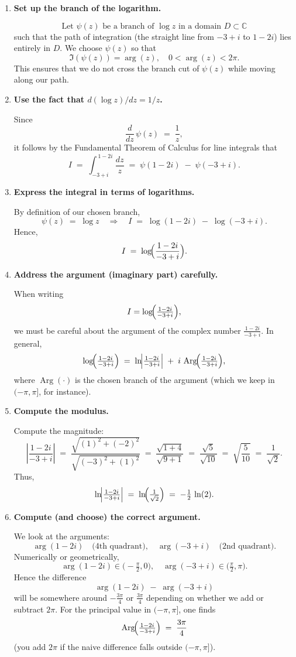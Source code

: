 \documentclass[12pt]{article}
\DeclareMathOperator{\Arg}{Arg}
\theoremstyle{definition} %
\theoremstyle{plain} %
\begin{document}
\begin{enumerate}
\item \textbf{Set up the branch of the logarithm.}

\[
\text{Let }\psi(z)\text{ be a branch of }\log z\text{ in a domain }D \subset \mathbb{C}
\]
such that the path of integration (the straight line from $-3+i$ to $1-2i$) lies entirely in $D$. We choose $\psi(z)$ so that
\[
\Im(\psi(z)) = \arg(z), 
\quad
0 < \arg(z) < 2\pi.
\]
This ensures that we do not cross the branch cut of $\psi(z)$ while moving along our path.

\item \textbf{Use the fact that $d(\log z)/dz = 1/z$.}

Since
\[
\frac{d}{dz}\,\psi(z) \;=\; \frac{1}{z},
\]
it follows by the Fundamental Theorem of Calculus for line integrals that
\[
I \;=\; \int_{-3+i}^{\,1-2i} \frac{dz}{z}
\;=\;
\psi(1-2i) \;-\;\psi(-3+i).
\]

\item \textbf{Express the integral in terms of logarithms.}

By definition of our chosen branch,
\[
\psi(z) \;=\;\log z
\quad\Longrightarrow\quad
I \;=\; \log(1-2i)\;-\;\log(-3+i).
\]
Hence,
\[
I \;=\;\log\!\Bigl(\frac{1-2i}{-3+i}\Bigr).
\]

\item \textbf{Address the argument (imaginary part) carefully.}

When writing 
\[
I = \log\!\Bigl(\tfrac{1-2i}{-3+i}\Bigr),
\]
we must be careful about the argument of the complex number $\tfrac{1-2i}{-3+i}$.  In general,
\[
\log\!\Bigl(\tfrac{1-2i}{-3+i}\Bigr)
\;=\;
\ln\!\Bigl|\tfrac{1-2i}{-3+i}\Bigr|
\;+\;
i\,\Arg\!\Bigl(\tfrac{1-2i}{-3+i}\Bigr),
\]
where $\Arg(\cdot)$ is the chosen branch of the argument (which we keep in $(-\pi,\pi]$, for instance).

\item \textbf{Compute the modulus.}

Compute the magnitude:
\[
\left|\frac{1-2i}{-3 + i}\right|
\;=\;
\frac{\sqrt{(1)^2 + (-2)^2}}{\sqrt{(-3)^2 + (1)^2}}
\;=\;
\frac{\sqrt{1 + 4}}{\sqrt{9 + 1}}
\;=\;
\frac{\sqrt{5}}{\sqrt{10}}
\;=\;
\sqrt{\frac{5}{10}}
\;=\;
\frac{1}{\sqrt{2}}.
\]
Thus,
\[
\ln\!\Bigl|\tfrac{1-2i}{-3+i}\Bigr|
\;=\;
\ln\!\Bigl(\tfrac{1}{\sqrt{2}}\Bigr)
\;=\;
-\tfrac{1}{2}\,\ln(2).
\]

\item \textbf{Compute (and choose) the correct argument.}

We look at the arguments:
\[
\arg(1-2i) \quad\text{(4th quadrant)}, 
\quad
\arg(-3 + i) \quad\text{(2nd quadrant)}.
\]
Numerically or geometrically,
\[
\arg(1-2i)\in\bigl(-\tfrac{\pi}{2},0\bigr),
\quad
\arg(-3+i)\in\bigl(\tfrac{\pi}{2},\pi\bigr).
\]
Hence the difference
\[
\arg(1-2i)\;-\;\arg(-3+i)
\]
will be somewhere around $-\frac{3\pi}{4}$ or $\frac{3\pi}{4}$ depending on whether we add or subtract $2\pi$.  For the principal value in $(-\pi,\pi]$, one finds
\[
\Arg\!\Bigl(\tfrac{1-2i}{-3+i}\Bigr) \;=\; \frac{3\pi}{4}
\]
(you add $2\pi$ if the naive difference falls outside $(-\pi,\pi]$).


\end{enumerate}
\end{document}
